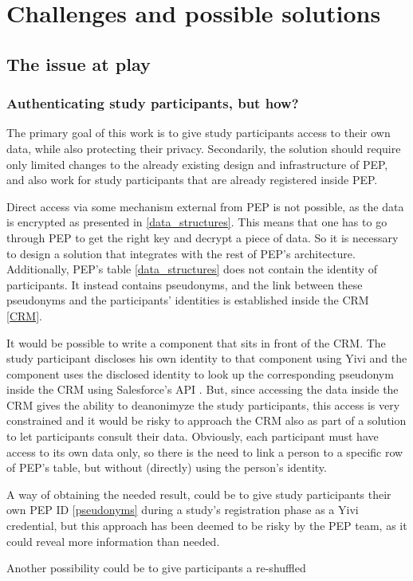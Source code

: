 \documentclass{report}
\begin{document}
\chapter{Challenges and possible solutions}
\section{The issue at play}
\subsection{Authenticating study participants, but how?}
The primary goal of this work is to give study participants access to their own data, while also protecting their privacy. Secondarily, the solution should require only limited
changes to the already existing design and infrastructure of PEP, and also work for study participants that are already registered inside PEP.\par Direct access via some mechanism
external from PEP is not possible, as the data is encrypted as presented in \ref{data_structures}. This means that one has to go through PEP to get the right key and decrypt a
piece of data. So it is necessary to design a solution that integrates with the rest of PEP's architecture. Additionally, PEP's table \ref{data_structures} does not contain the
identity of participants. It instead contains pseudonyms, and the link between these pseudonyms and the participants' identities is established inside the CRM \ref{CRM}. \par 
It would be possible to write a component that sits in front of the CRM. The study participant discloses his own identity to that component using Yivi and the component uses the
disclosed identity to look up the corresponding pseudonym inside the CRM using Salesforce's API \cite{salesforce}. But, since accessing the data inside the CRM gives the ability to
deanonimyze the study participants, this access is very constrained and it would be risky to approach the CRM also as part of a solution to let participants consult their data.
Obviously, each participant must have access to its own data only, so there is the need to link a person to a specific row of PEP's table, but without (directly) using the person's
identity. \par 
A way of obtaining the needed result, could be to give study participants their own PEP ID \ref{pseudonyms} during a study's registration phase as a Yivi credential,
but this approach has been deemed to be risky by the PEP team, as it could reveal more information than needed. \par Another possibility could be to give participants a re-shuffled
\end{document}
